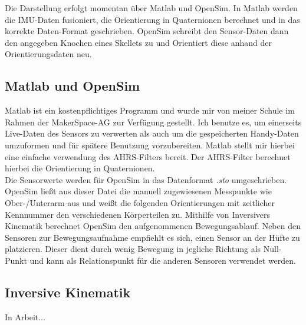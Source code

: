 Die Darstellung erfolgt momentan über Matlab und OpenSim. In Matlab werden die IMU-Daten
fusioniert, die Orientierung in Quaternionen berechnet und in das korrekte Daten-Format geschrieben. 
OpenSim schreibt den Sensor-Daten dann den angegeben Knochen eines Skellets zu und Orientiert diese anhand 
der Orientierungsdaten neu.

\subsection{Matlab und OpenSim}
Matlab ist ein kostenpflichtiges Programm und wurde mir von meiner Schule im Rahmen der MakerSpace-AG zur Verfügung 
gestellt. Ich benutze es, um einerseits Live-Daten des Sensors zu verwerten als auch um die gespeicherten Handy-Daten 
umzuformen und für spätere Benutzung vorzubereiten. Matlab stellt mir hierbei eine einfache verwendung des AHRS-Filters
bereit. Der AHRS-Filter berechnet hierbei die Orientierung in Quaternionen. \\ 
Die Sensorwerte werden für OpenSim in das Datenformat \textit{.sto} umgeschrieben. OpenSim ließt aus dieser Datei die 
manuell zugewiesenen Messpunkte wie Ober-/Unterarm aus und weißt die folgenden Orientierungen mit zeitlicher Kennnummer
den verschiedenen Körperteilen zu. Mithilfe von Inversivers Kinematik berechnet OpenSim den aufgenommenen Bewegungsablauf.
Neben den Sensoren zur Bewegungsaufnahme empfiehlt es sich, einen Sensor an der Hüfte zu platzieren. Dieser dient durch
wenig Bewegung in jegliche Richtung als Null-Punkt und kann als Relationspunkt für die anderen Sensoren verwendet werden.

\subsection{Inversive Kinematik}
In Arbeit...